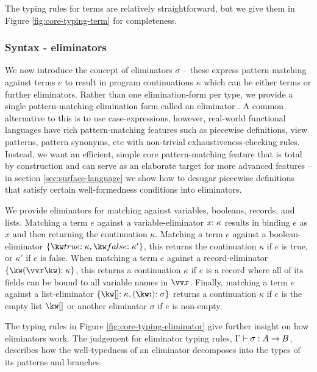 The typing rules for terms are relatively straightforward, but we give them in Figure 
\ref{fig:core-typing-term} for completeness. 
  


\subsubsection{Syntax - eliminators}
\label{sssec:syntax-eliminator}
We now introduce the concept of eliminators $\sigma$ -- these express pattern matching against terms $e$ to result in program continuations $\kappa$ which can be either terms or further eliminators. Rather than one elimination-form per type, we provide a single pattern-matching elimination form called an eliminator \cite{hinze00}. A common alternative to this is to use case-expressions, however, real-world functional languages have rich pattern-matching features such as piecewise definitions, view patterns, pattern synonyms, etc with non-trivial exhaustiveness-checking rules. Instead, we want an efficient, simple core pattern-matching feature that is total by construction and can serve as an elaborate target for more advanced features -- in section \ref{sec:surface-language} we show how to desugar piecewise definitions that satisfy certain well-formedness conditions into eliminators. 

We provide eliminators for matching against variables, booleans, records, and lists. Matching a term $e$ against a variable-eliminator ${x}{:}\;{\kappa}$ results in binding $e$ as $x$ and then returning the continuation $\kappa$. Matching a term $e$ against a boolean-eliminator $\elimBool{\kappa}{\kappa'}$, this returns the continuation $\kappa$ if $e$ is true, or $\kappa'$ if $e$ is false. When matching a term $e$ against a record-eliminator $\elimRec{\seq{x}}{\kappa}$, this returns a continuation $\kappa$ if $e$ is a record where all of its fields can be bound to all variable names in $\seq{x}$. Finally, matching a term $e$ against a list-eliminator $\elimList{\kappa}{\sigma}$ returns a continuation $\kappa$ if $e$ is the empty list $\exNil$ or another eliminator $\sigma$ if $e$ is non-empty.



The typing rules in Figure \ref{fig:core-typing-eliminator} give further insight on how eliminators work. The judgement for eliminator typing rules, $\Gamma \vdash \sigma: {A}\rightarrow{B}$, describes how the well-typedness of an eliminator decomposes into the types of its patterns and branches. 

